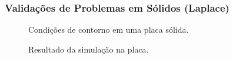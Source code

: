 \documentclass{beamer}
\begin{document}
\begin{frame}
  \frametitle{Validações de Problemas em Sólidos (Laplace)}
  
  \begin{minipage}{.48\textwidth}
    \centering
    \begin{figure}
       {\raggedleft \tiny Condições de contorno em uma placa sólida.}
    \end{figure}
  \end{minipage}
  \hfill
  \begin{minipage}{.48\textwidth}
    \begin{figure}
       {\raggedleft \tiny Resultado da simulação na placa.}
    \end{figure}
  \end{minipage}
  

\end{frame}
\end{document}
